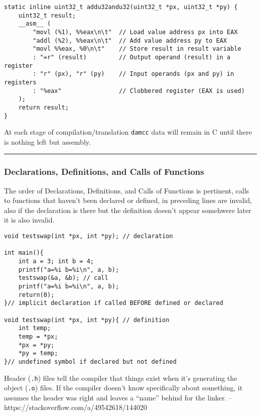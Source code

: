 \begin{verbatim}
static inline uint32_t addu32andu32(uint32_t *px, uint32_t *py) {
    uint32_t result;
    __asm__ (
        "movl (%1), %%eax\n\t"  // Load value address px into EAX
        "addl (%2), %%eax\n\t"  // Add value address py to EAX
        "movl %%eax, %0\n\t"    // Store result in result variable
        : "=r" (result)         // Output operand (result) in a register
        : "r" (px), "r" (py)    // Input operands (px and py) in registers
        : "%eax"                // Clobbered register (EAX is used)
    );
    return result;
}
\end{verbatim}

At each stage of compilation/translation \texttt{damcc} data will remain
in C until there is nothing left but assembly.

\begin{center}\rule{0.5\linewidth}{0.5pt}\end{center}

\hypertarget{declarations-definitions-and-calls-of-functions}{%
\subsubsection{Declarations, Definitions, and Calls of
Functions}\label{declarations-definitions-and-calls-of-functions}}

The order of Declarations, Definitions, and Calls of Functions is
pertinent, calls to functions that haven't been declared or defined, in
preceding lines are invalid, also if the declaration is there but the
definition doesn't appear somehwere later it is also invalid.

\begin{verbatim}
void testswap(int *px, int *py); // declaration

int main(){
    int a = 3; int b = 4;
    printf("a=%i b=%i\n", a, b);
    testswap(&a, &b); // call
    printf("a=%i b=%i\n", a, b);
    return(0);
}// implicit declaration if called BEFORE defined or declared

void testswap(int *px, int *py){ // definition
    int temp;
    temp = *px;
    *px = *py;
    *py = temp;
}// undefined symbol if declared but not defined
\end{verbatim}

Header (\texttt{.h}) files tell the compiler that things exist when it's
generating the object (\texttt{.o}) files. If the compiler doesn't know
specifically about something, it assumes the header was right and leaves
a ``name'' behind for the linker. --
https://stackoverflow.com/a/49542618/144020

